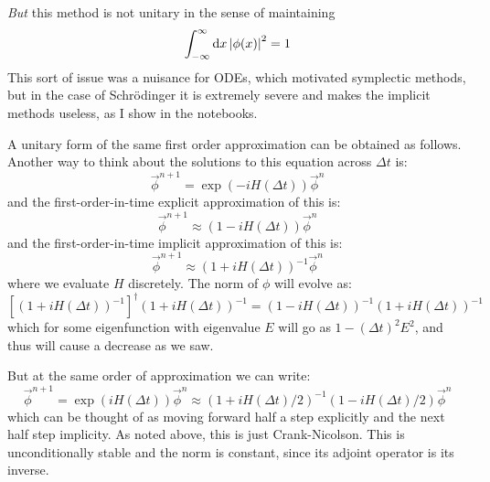 {\it But} this method is not unitary in the sense of maintaining
\begin{equation}
 \int_{-\infty}^{\infty} {\rm d}x \left|\phi(x)\right|^2 = 1
\end{equation}
This sort of issue was a
nuisance for ODEs, which motivated symplectic methods, but in the case
of Schr\"odinger it is extremely severe and makes the implicit methods
useless, as I show in the notebooks.

A unitary form of the same first order approximation can be obtained
as follows. Another way to think about the solutions to this equation
across $\Delta t$ is:
\begin{equation}
\vec{\phi}^{n+1} = \exp(- i H (\Delta t)) \vec{\phi}^n
\end{equation}
and the first-order-in-time explicit approximation of this is:
\begin{equation}
\vec{\phi}^{n+1} \approx (1 - i H (\Delta t)) \vec{\phi}^n
\end{equation}
and the first-order-in-time implicit approximation of this is:
\begin{equation}
\vec{\phi}^{n+1} \approx \left(1 + i H (\Delta t)\right)^{-1} \vec{\phi}^n
\end{equation}
where we evaluate $H$ discretely. The norm of $\phi$ will evolve as:
\begin{equation}
\left[\left(1 + i H (\Delta t)\right)^{-1}\right]^\dag
\left(1 + i H (\Delta t)\right)^{-1}  =
\left(1 - i H (\Delta t)\right)^{-1}
\left(1 + i H (\Delta t)\right)^{-1}
\end{equation}
which for some eigenfunction with eigenvalue $E$ will go as $1-(\Delta
t)^2 E^2$, and thus will cause a decrease as we saw. 

But at the same order of approximation we can write:
\begin{equation}
\vec{\phi}^{n+1} = \exp(i H (\Delta t)) \vec{\phi}^n \approx
(1 + i H (\Delta t) / 2)^{-1}
(1 - i H (\Delta t) / 2)
\vec{\phi}^n
\end{equation}
which can be thought of as moving forward half a step explicitly and
the next half step implicity. As noted above, this is just
Crank-Nicolson. This is unconditionally stable and the norm is
constant, since its adjoint operator is its inverse.
